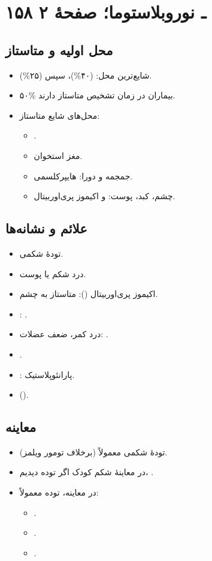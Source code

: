 \documentclass[12pt,a4paper]{article}
\begin{document}
\clearpage
\section*{۱۵۸ ـ نوروبلاستوما؛ صفحهٔ ۲}
\subsection*{محل اولیه و متاستاز}
\begin{itemize}
\item شایع‌ترین محل:  (۴۰\%)، سپس  (۲۵\%).
\item ۵۰\% بیماران در زمان تشخیص متاستاز دارند.
\item محل‌های شایع متاستاز:
  \begin{itemize}
  \item {}.
  \item مغز استخوان.
  \item جمجمه و دورا: هایپرکلسمی.
  \item چشم، کبد، پوست:  و اکیموز پری‌اوربیتال.
  \end{itemize}
\end{itemize}

\subsection*{علائم و نشانه‌ها}
\begin{itemize}
\item تودهٔ شکمی.
\item درد شکم یا پوست.
\item اکیموز پری‌اوربیتال (): متاستاز به چشم.
\item {}: .
\item درد کمر، ضعف عضلات: .
\item {}.
\item {}: پارانئوپلاستیک.
\item {} ().
\end{itemize}

\subsection*{معاینه}
\begin{itemize}
\item تودهٔ شکمی معمولاً  (برخلاف تومور ویلمز).
\item در معاینهٔ شکم کودک اگر توده دیدیم، .
\item در معاینه، توده معمولاً:
  \begin{itemize}
  \item {}.
  \item {}.
  \item {}.
  \end{itemize}
\end{itemize}
\end{document}
